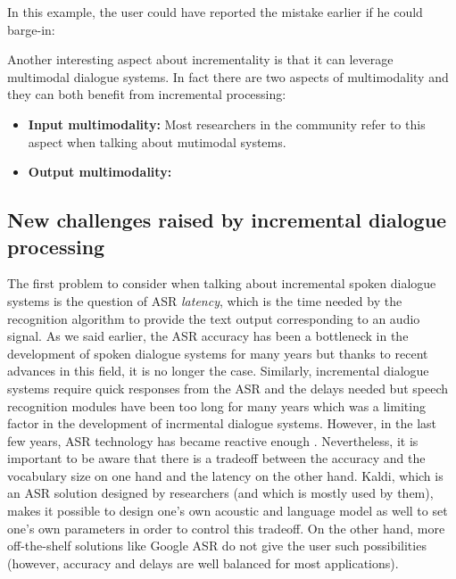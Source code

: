 								In this example, the user could have reported the mistake earlier if he could barge-in:
								
								\begin{dialogue}
								\end{dialogue}
								
								Another interesting aspect about incrementality is that it can leverage multimodal dialogue systems. In fact there are two aspects of multimodality and they can both benefit from incremental processing:
								
								\begin{itemize}
									\item \textbf{Input multimodality:} Most researchers in the community refer to this aspect when talking about mutimodal systems.
									\item \textbf{Output multimodality:}
								\end{itemize}


	\subsection{New challenges raised by incremental dialogue processing}
	\label{soa:challengesincr}
    
		The first problem to consider when talking about incremental spoken dialogue systems is the question of ASR \textit{latency}, which is the time needed by the recognition algorithm to provide the text output corresponding to an audio signal. As we said earlier, the ASR accuracy has been a bottleneck in the development of spoken dialogue systems for many years but thanks to recent advances in this field, it is no longer the case. Similarly, incremental dialogue systems require quick responses from the ASR and the delays needed but speech recognition modules have been too long for many years which was a limiting factor in the development of incrmental dialogue systems. However, in the last few years, ASR technology has became reactive enough \cite{Platek2014}. Nevertheless, it is important to be aware that there is a tradeoff between the accuracy and the vocabulary size on one hand and the latency on the other hand. Kaldi, which is an ASR solution designed by researchers (and which is mostly used by them), makes it possible to design one's own acoustic and language model as well to set one's own parameters in order to control this tradeoff. On the other hand, more off-the-shelf solutions like Google ASR do not give the user such possibilities (however, accuracy and delays are well balanced for most applications).


